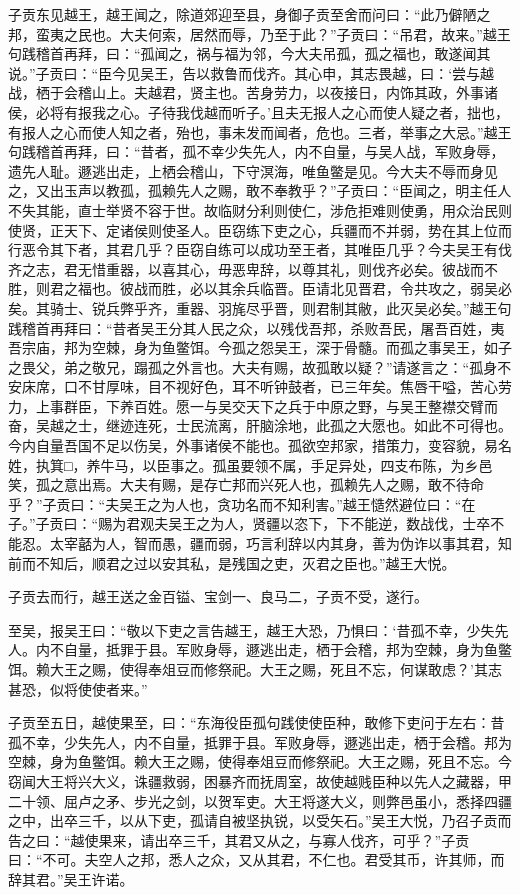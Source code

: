 \documentclass[12pt,UTF8]{ctexbook}
\begin{document}
子贡东见越王，越王闻之，除道郊迎至县，身御子贡至舍而问曰：“此乃僻陋之邦，蛮夷之民也。大夫何索，居然而辱，乃至于此？”子贡曰：“吊君，故来。”越王句践稽首再拜，曰：“孤闻之，祸与福为邻，今大夫吊孤，孤之福也，敢遂闻其说。”子贡曰：“臣今见吴王，告以救鲁而伐齐。其心申，其志畏越，曰：‘尝与越战，栖于会稽山上。夫越君，贤主也。苦身劳力，以夜接日，内饰其政，外事诸侯，必将有报我之心。子待我伐越而听子。’且夫无报人之心而使人疑之者，拙也，有报人之心而使人知之者，殆也，事未发而闻者，危也。三者，举事之大忌。”越王句践稽首再拜，曰：“昔者，孤不幸少失先人，内不自量，与吴人战，军败身辱，遗先人耻。遯逃出走，上栖会稽山，下守溟海，唯鱼鳖是见。今大夫不辱而身见之，又出玉声以教孤，孤赖先人之赐，敢不奉教乎？”子贡曰：“臣闻之，明主任人不失其能，直士举贤不容于世。故临财分利则使仁，涉危拒难则使勇，用众治民则使贤，正天下、定诸侯则使圣人。臣窃练下吏之心，兵疆而不并弱，势在其上位而行恶令其下者，其君几乎？臣窃自练可以成功至王者，其唯臣几乎？今夫吴王有伐齐之志，君无惜重器，以喜其心，毋恶卑辞，以尊其礼，则伐齐必矣。彼战而不胜，则君之福也。彼战而胜，必以其余兵临晋。臣请北见晋君，令共攻之，弱吴必矣。其骑士、锐兵弊乎齐，重器、羽旄尽乎晋，则君制其敝，此灭吴必矣。”越王句践稽首再拜曰：“昔者吴王分其人民之众，以残伐吾邦，杀败吾民，屠吾百姓，夷吾宗庙，邦为空棘，身为鱼鳖饵。今孤之怨吴王，深于骨髓。而孤之事吴王，如子之畏父，弟之敬兄，蹋孤之外言也。大夫有赐，故孤敢以疑？”请遂言之：“孤身不安床席，口不甘厚味，目不视好色，耳不听钟鼓者，已三年矣。焦唇干嗌，苦心劳力，上事群臣，下养百姓。愿一与吴交天下之兵于中原之野，与吴王整襟交臂而奋，吴越之士，继迹连死，士民流离，肝脑涂地，此孤之大愿也。如此不可得也。今内自量吾国不足以伤吴，外事诸侯不能也。孤欲空邦家，措策力，变容貌，易名姓，执箕□，养牛马，以臣事之。孤虽要领不属，手足异处，四支布陈，为乡邑笑，孤之意出焉。大夫有赐，是存亡邦而兴死人也，孤赖先人之赐，敢不待命乎？”子贡曰：“夫吴王之为人也，贪功名而不知利害。”越王慥然避位曰：“在子。”子贡曰：“赐为君观夫吴王之为人，贤疆以恣下，下不能逆，数战伐，士卒不能忍。太宰嚭为人，智而愚，疆而弱，巧言利辞以内其身，善为伪诈以事其君，知前而不知后，顺君之过以安其私，是残国之吏，灭君之臣也。”越王大悦。

子贡去而行，越王送之金百镒、宝剑一、良马二，子贡不受，遂行。

至吴，报吴王曰：“敬以下吏之言告越王，越王大恐，乃惧曰：‘昔孤不幸，少失先人。内不自量，抵罪于县。军败身辱，遯逃出走，栖于会稽，邦为空棘，身为鱼鳖饵。赖大王之赐，使得奉俎豆而修祭祀。大王之赐，死且不忘，何谋敢虑？’其志甚恐，似将使使者来。”

子贡至五日，越使果至，曰：“东海役臣孤句践使使臣种，敢修下吏问于左右：昔孤不幸，少失先人，内不自量，抵罪于县。军败身辱，遯逃出走，栖于会稽。邦为空棘，身为鱼鳖饵。赖大王之赐，使得奉俎豆而修祭祀。大王之赐，死且不忘。今窃闻大王将兴大义，诛疆救弱，困暴齐而抚周室，故使越贱臣种以先人之藏器，甲二十领、屈卢之矛、步光之剑，以贺军吏。大王将遂大义，则弊邑虽小，悉择四疆之中，出卒三千，以从下吏，孤请自被坚执锐，以受矢石。”吴王大悦，乃召子贡而告之曰：“越使果来，请出卒三千，其君又从之，与寡人伐齐，可乎？”子贡曰：“不可。夫空人之邦，悉人之众，又从其君，不仁也。君受其币，许其师，而辞其君。”吴王许诺。
\end{document}
